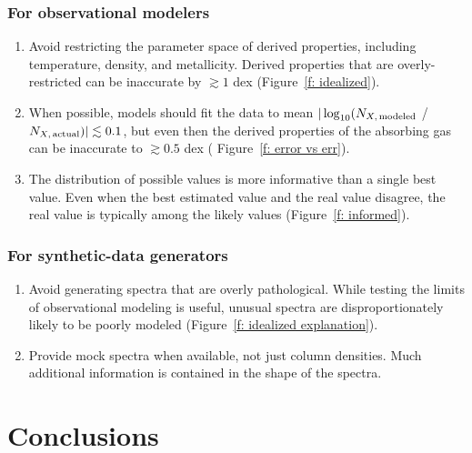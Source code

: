 \documentclass[fleqn,usenatbib]{mnras}
\begin{document}
\subsubsection{For observational modelers}

\begin{enumerate}
    \item Avoid restricting the parameter space of derived properties, including temperature, density, and metallicity. Derived properties that are overly-restricted can be inaccurate by $\gtrsim 1$ dex (Figure~\ref{f: idealized}).
    \item When possible, models should fit the data to mean $\vert \log_{10}( N_{X,\,{\rm modeled}}$ / $N_{X,\,{\rm actual}}) \vert \lesssim 0.1$, but even then the derived properties of the absorbing gas can be inaccurate to $\gtrsim 0.5$ dex ( Figure~\ref{f: error vs err}).
    \item The distribution of possible values is more informative than a single best value. Even when the best estimated value and the real value disagree, the real value is typically among the likely values (Figure~\ref{f: informed}).
\end{enumerate}

\subsubsection{For synthetic-data generators}

\begin{enumerate}
    \item Avoid generating spectra that are overly pathological. While testing the limits of observational modeling is useful, unusual spectra are disproportionately likely to be poorly modeled (Figure~\ref{f: idealized explanation}).
    \item Provide mock spectra when available, not just column densities. Much additional information is contained in the shape of the spectra.
\end{enumerate}

\section{Conclusions}
\label{s: conclusions}
\end{document}
